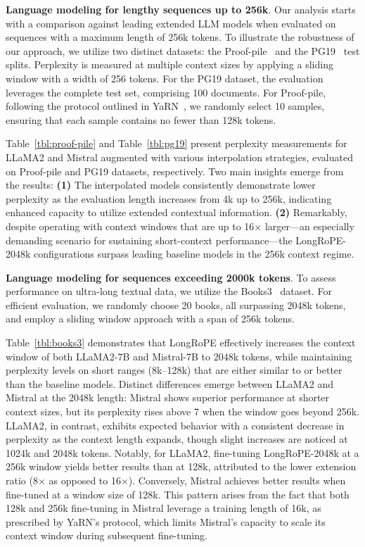 \label{sec:mainresult}
\textbf{Language modeling for lengthy sequences up to 256k}. Our analysis starts with a comparison against leading extended LLM models when evaluated on sequences with a maximum length of 256k tokens. To illustrate the robustness of our approach, we utilize two distinct datasets: the Proof-pile~\cite{pg19} and the PG19~\cite{pile} test splits. Perplexity is measured at multiple context sizes by applying a sliding window with a width of 256 tokens. For the PG19 dataset, the evaluation leverages the complete test set, comprising 100 documents. For Proof-pile, following the protocol outlined in YaRN~\cite{yarn}, we randomly select 10 samples, ensuring that each sample contains no fewer than 128k tokens.

Table~\ref{tbl:proof-pile} and Table~\ref{tbl:pg19} present perplexity measurements for LLaMA2 and Mistral augmented with various interpolation strategies, evaluated on Proof-pile and PG19 datasets, respectively. Two main insights emerge from the results: \textbf{(1)} The interpolated models consistently demonstrate lower perplexity as the evaluation length increases from 4k up to 256k, indicating enhanced capacity to utilize extended contextual information. \textbf{(2)} Remarkably, despite operating with context windows that are up to 16$\times$ larger—an especially demanding scenario for sustaining short-context performance—the LongRoPE-2048k configurations surpass leading baseline models in the 256k context regime.

\textbf{Language modeling for sequences exceeding 2000k tokens}. To assess performance on ultra-long textual data, we utilize the Books3~\cite{pile} dataset. For efficient evaluation, we randomly choose 20 books, all surpassing 2048k tokens, and employ a sliding window approach with a span of 256k tokens.

Table~\ref{tbl:books3} demonstrates that LongRoPE effectively increases the context window of both LLaMA2-7B and Mistral-7B to 2048k tokens, while maintaining perplexity levels on short ranges (8k–128k) that are either similar to or better than the baseline models. Distinct differences emerge between LLaMA2 and Mistral at the 2048k length: Mistral shows superior performance at shorter context sizes, but its perplexity rises above 7 when the window goes beyond 256k. LLaMA2, in contrast, exhibits expected behavior with a consistent decrease in perplexity as the context length expands, though slight increases are noticed at 1024k and 2048k tokens. Notably, for LLaMA2, fine-tuning LongRoPE-2048k at a 256k window yields better results than at 128k, attributed to the lower extension ratio (8$\times$ as opposed to 16$\times$). Conversely, Mistral achieves better results when fine-tuned at a window size of 128k. This pattern arises from the fact that both 128k and 256k fine-tuning in Mistral leverage a training length of 16k, as prescribed by YaRN's protocol, which limits Mistral's capacity to scale its context window during subsequent fine-tuning.

